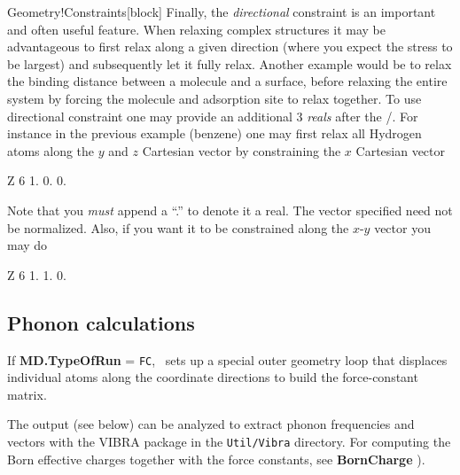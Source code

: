 \begin{fdfentry}{Geometry!Constraints}[block]
  Finally, the \emph{directional} constraint is an important and often
  useful feature. 
  When relaxing complex structures it may be advantageous to first
  relax along a given direction (where you expect the stress to be
  largest) and subsequently let it fully relax. Another example would
  be to relax the binding distance between a molecule and a surface,
  before relaxing the entire system by forcing the molecule and
  adsorption site to relax together.
  To use directional constraint one may provide an additional 3
  \emph{reals} after the /.
  For instance in the previous example (benzene) one may first relax
  all Hydrogen atoms along the $y$ and $z$ Cartesian vector by
  constraining the $x$ Cartesian vector
  \begin{fdfexample}
      Z 6 1. 0. 0.
  \end{fdfexample}
  Note that you \emph{must} append a ``.'' to denote it a real. The
  vector specified need not be normalized. Also, if you want it to
  be constrained along the $x$-$y$ vector you may do
  \begin{fdfexample}
      Z 6 1. 1. 0.
  \end{fdfexample}
  
\end{fdfentry}

\subsection{Phonon calculations}

If \textbf{MD.TypeOfRun} = \texttt{FC}, \siesta\ sets up a special
outer geometry loop that displaces individual atoms along the
coordinate directions to build the force-constant matrix.

The output (see below) can be analyzed to extract phonon frequencies
and vectors with the VIBRA package in the \texttt{Util/Vibra}
directory. For computing the Born effective charges together with the
force constants, see \textbf{BornCharge} ).

